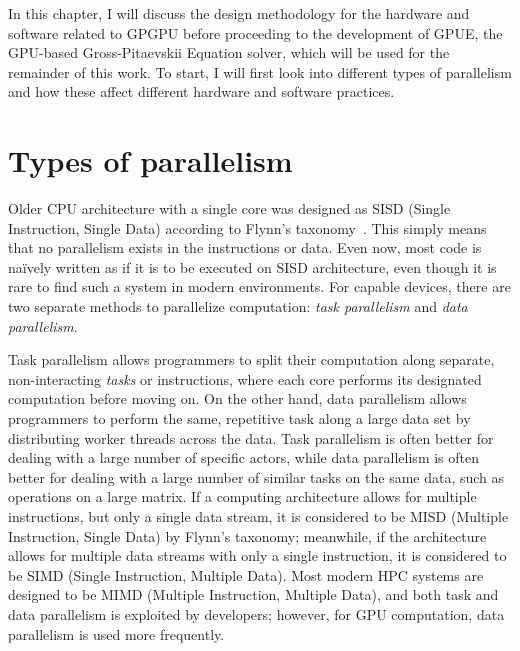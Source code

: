 In this chapter, I will discuss the design methodology for the hardware and software related to GPGPU before proceeding to the development of GPUE, the GPU-based Gross-Pitaevskii Equation solver, which will be used for the remainder of this work.
To start, I will first look into different types of parallelism and how these affect different hardware and software practices.

\section{Types of parallelism}

Older CPU architecture with a single core was designed as SISD (Single Instruction, Single Data) according to Flynn's taxonomy~\cite{gurd1988}. 
This simply means that no parallelism exists in the instructions or data.
Even now, most code is na\"ively written as if it is to be executed on SISD architecture, even though it is rare to find such a system in modern environments.
For capable devices, there are two separate methods to parallelize computation: \textit{task parallelism} and \textit{data parallelism}.

Task parallelism allows programmers to split their computation along separate, non-interacting \textit{tasks} or instructions, where each core performs its designated computation before moving on.
On the other hand, data parallelism allows programmers to perform the same, repetitive task along a large data set by distributing worker threads across the data.
Task parallelism is often better for dealing with a large number of specific actors, while data parallelism is often better for dealing with a large number of similar tasks on the same data, such as operations on a large matrix.
If a computing architecture allows for multiple instructions, but only a single data stream, it is considered to be MISD (Multiple Instruction, Single Data) by Flynn's taxonomy; meanwhile, if the architecture allows for multiple data streams with only a single instruction, it is considered to be SIMD (Single Instruction, Multiple Data).
Most modern HPC systems are designed to be MIMD (Multiple Instruction, Multiple Data), and both task and data parallelism is exploited by developers; however, for GPU computation, data parallelism is used more frequently.

